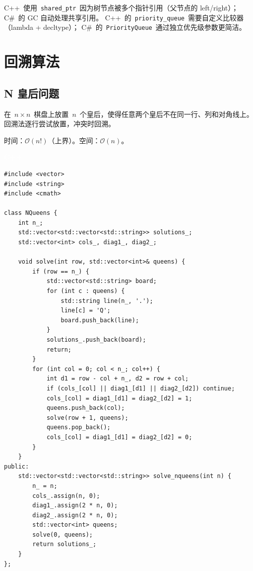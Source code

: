 \documentclass[12pt,a4paper,fontset=fandol]{ctexbook}
\newcommand{\cpplabel}{%
  \noindent\begin{tcolorbox}[sharp corners,colback=cppheadbg,colframe=cppheadbg,
    left=6pt,right=6pt,top=2pt,bottom=2pt,boxrule=0pt]
  \textcolor{white}{\small\bfseries\sffamily C++}\end{tcolorbox}%
}
\newcommand{\bigO}[1]{\mathcal{O}(#1)}
\newcommand{\Tp}[1]{\texttt{#1}}
\begin{document}
\begin{compare}
C++~使用~\Tp{shared\_ptr}~因为树节点被多个指针引用（父节点的 left/right）；
C\#~的 GC 自动处理共享引用。
C++~的~\Tp{priority\_queue}~需要自定义比较器（lambda + decltype）；
C\#~的~\Tp{PriorityQueue}~通过独立优先级参数更简洁。
\end{compare}

\part{回溯算法}

\chapter{N 皇后问题}

在~$n \times n$~棋盘上放置~$n$~个皇后，使得任意两个皇后不在同一行、列和对角线上。
回溯法逐行尝试放置，冲突时回溯。

\begin{complexitybox}
  时间：$\bigO{n!}$（上界）。空间：$\bigO{n}$。
\end{complexitybox}

\cpplabel
\begin{lstlisting}[style=cppstyle]
#include <vector>
#include <string>
#include <cmath>

class NQueens {
    int n_;
    std::vector<std::vector<std::string>> solutions_;
    std::vector<int> cols_, diag1_, diag2_;

    void solve(int row, std::vector<int>& queens) {
        if (row == n_) {
            std::vector<std::string> board;
            for (int c : queens) {
                std::string line(n_, '.');
                line[c] = 'Q';
                board.push_back(line);
            }
            solutions_.push_back(board);
            return;
        }
        for (int col = 0; col < n_; col++) {
            int d1 = row - col + n_, d2 = row + col;
            if (cols_[col] || diag1_[d1] || diag2_[d2]) continue;
            cols_[col] = diag1_[d1] = diag2_[d2] = 1;
            queens.push_back(col);
            solve(row + 1, queens);
            queens.pop_back();
            cols_[col] = diag1_[d1] = diag2_[d2] = 0;
        }
    }
public:
    std::vector<std::vector<std::string>> solve_nqueens(int n) {
        n_ = n;
        cols_.assign(n, 0);
        diag1_.assign(2 * n, 0);
        diag2_.assign(2 * n, 0);
        std::vector<int> queens;
        solve(0, queens);
        return solutions_;
    }
};
\end{lstlisting}
\end{document}
